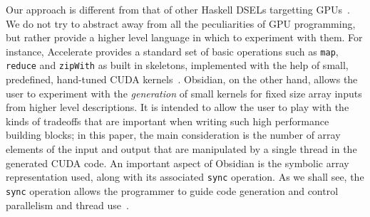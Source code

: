 \documentclass[]{sigplanconf}
\begin{document}
Our approach is different from that of other Haskell DSELs targetting
GPUs~\cite{ACCELERATE,NIKOLA,BARRACUDA}. 
We do not try to abstract away from 
all the peculiarities of GPU programming, but rather provide a higher 
level language in which to experiment with them.
For instance,
Accelerate provides a standard set of basic operations such as 
{\tt map}, {\tt reduce} and {\tt zipWith} as built in skeletons, implemented
with the help of small, predefined, hand-tuned CUDA kernels~\cite{ACCELERATE}. 
Obsidian, on the other hand, allows the user to experiment with the
{\em generation} of small kernels for fixed size array inputs
from higher level descriptions.
It is intended to allow the user to play with the kinds of tradeoffs that are important
when writing such high performance building blocks; in this paper, the main consideration
is the number of array elements of the input and output that are manipulated
by a single thread in the generated CUDA code.
An important aspect of Obsidian is the symbolic array representation used, along
with its associated {\tt sync} operation. As we shall see, the {\tt sync} operation
allows the programmer to guide code generation and control parallelism and thread
use~\cite{JSLIC}.





\end{document}
